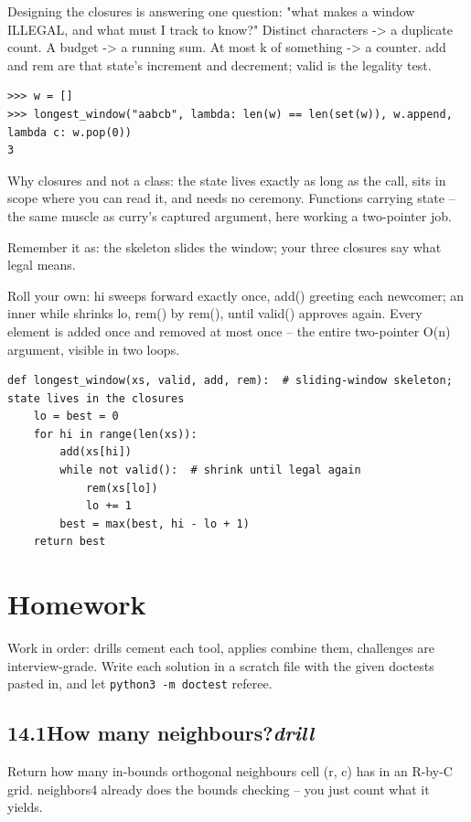 \documentclass[10pt,letterpaper]{book}
\begin{document}
Designing the closures is answering one question: "what makes a window ILLEGAL, and what must I track to know?" Distinct characters -> a duplicate count. A budget -> a running sum. At most k of something -> a counter. add and rem are that state's increment and decrement; valid is the legality test.

\begin{lstlisting}[style=ex]
>>> w = []
>>> longest_window("aabcb", lambda: len(w) == len(set(w)), w.append, lambda c: w.pop(0))
3
\end{lstlisting}

Why closures and not a class: the state lives exactly as long as the call, sits in scope where you can read it, and needs no ceremony. Functions carrying state -- the same muscle as curry's captured argument, here working a two-pointer job.


Remember it as: the skeleton slides the window; your three closures say what legal means.


Roll your own: hi sweeps forward exactly once, add() greeting each newcomer; an inner while shrinks lo, rem() by rem(), until valid() approves again. Every element is added once and removed at most once -- the entire two-pointer O(n) argument, visible in two loops.

\begin{lstlisting}[style=ex]
def longest_window(xs, valid, add, rem):  # sliding-window skeleton; state lives in the closures
    lo = best = 0
    for hi in range(len(xs)):
        add(xs[hi])
        while not valid():  # shrink until legal again
            rem(xs[lo])
            lo += 1
        best = max(best, hi - lo + 1)
    return best
\end{lstlisting}

\section{Homework}
Work in order: drills cement each tool, applies combine them,
challenges are interview-grade. Write each solution in a scratch file with
the given doctests pasted in, and let \texttt{python3 -m doctest} referee.
\subsection*{14.1\quad How many neighbours?\hfill\textnormal{\textit{drill}}}
Return how many in-bounds orthogonal neighbours cell (r, c) has in an R-by-C grid. neighbors4 already does the bounds checking -- you just count what it yields.
\end{document}
